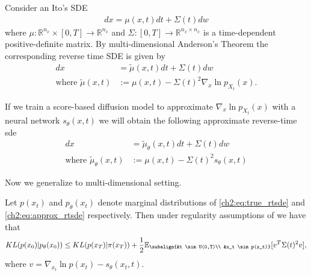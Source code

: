 Consider an Ito's SDE
\begin{align*}
    dx = \mu(x, t)dt + \Sigma(t)dw
\end{align*}
where $\mu: \mathbb{R}^{n_x} \times [0,T] \xrightarrow{} \mathbb{R}^{n_x}$ and $\Sigma: [0,T] \xrightarrow{} \mathbb{R}^{n_x \times n_x}$ is a time-dependent positive-definite matrix. By multi-dimensional Anderson's Theorem \cite{anderson1982reverse_time_sde} the corresponding reverse time SDE is given by 
\begin{align}
    \label{ch2:eq:true_rtsde}
    dx &= \tilde{\mu}(x, t)dt + \Sigma(t)dw \\
    \text{where } \tilde{\mu}(x,t) &:= \mu(x,t) -  \Sigma(t)^2 \nabla_x \ln p_{X_t}(x). \nonumber
\end{align}

If we train a score-based diffusion model to approximate $\nabla_x \ln p_{X_t}(x)$ with a neural network $s_\theta(x,t)$ we will obtain the following approximate reverse-time sde
\begin{align}
    \label{ch2:eq:approx_rtsde}
    dx &= \tilde{\mu}_\theta(x, t)dt + \Sigma(t)dw \\
    \text{where } \tilde{\mu}_\theta(x,t) &:= \mu(x,t) -  \Sigma(t)^2 s_\theta(x,t) \nonumber
\end{align} 


Now we generalize \cite[Theorem 1]{song2021maximum} to multi-dimensional setting.
\begin{theorem} 
    Let $p(x_t)$ and $p_\theta(x_t)$ denote marginal distributions of \ref{ch2:eq:true_rtsde} and \ref{ch2:eq:approx_rtsde} respectively. Then under regularity assumptions of \cite[Theorem 1]{song2021maximum} we have that 
    \label{ch2:thm:multi-dim}
    \begin{equation}
        KL(p(x_0) | p_\theta(x_0)) \leq KL(p(x_T) | \pi(x_T)) + \frac{1}{2} \mathbb{E}_{\subalign{&t \sim U(0,T)\\ &x_t \sim p(x_t)}} [v^T \Sigma(t)^2 v],
    \end{equation}
    where $v=\nabla_{x_t} \ln{p(x_t)} - s_\theta(x_t,t)$. 
\end{theorem}

